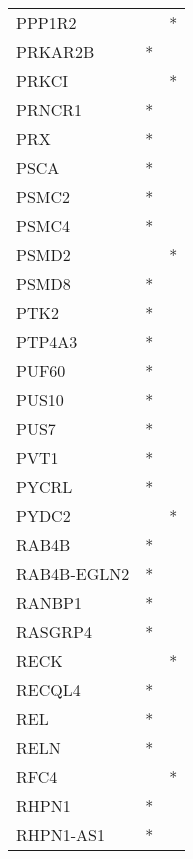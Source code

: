 \begin{longtable}{lcc}
PPP1R2           &                &          * \\
PRKAR2B          &              * &            \\
PRKCI            &                &          * \\
PRNCR1           &              * &            \\
PRX              &              * &            \\
PSCA             &              * &            \\
PSMC2            &              * &            \\
PSMC4            &              * &            \\
PSMD2            &                &          * \\
PSMD8            &              * &            \\
PTK2             &              * &            \\
PTP4A3           &              * &            \\
PUF60            &              * &            \\
PUS10            &              * &            \\
PUS7             &              * &            \\
PVT1             &              * &            \\
PYCRL            &              * &            \\
PYDC2            &                &          * \\
RAB4B            &              * &            \\
RAB4B-EGLN2      &              * &            \\
RANBP1           &              * &            \\
RASGRP4          &              * &            \\
RECK             &                &          * \\
RECQL4           &              * &            \\
REL              &              * &            \\
RELN             &              * &            \\
RFC4             &                &          * \\
RHPN1            &              * &            \\
RHPN1-AS1        &              * &            \\

\end{longtable}
